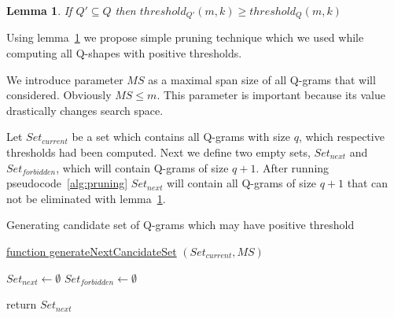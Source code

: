 \documentclass[paper=a4, fontsize=11pt]{scrartcl} %
\newtheorem{lemma}[theorem]{Lemma}
\numberwithin{equation}{section} %
\numberwithin{figure}{section} %
\numberwithin{table}{section} %
\begin{document}
\begin{lemma}
    \label{subSetLemma}
    If $Q' \subseteq Q$ then $threshold_{Q'}(m,k) \geq threshold_{Q}(m,k)$
\end{lemma}

Using lemma~\ref{subSetLemma} we propose simple pruning technique which we used
while computing all Q-shapes with positive thresholds.

We introduce parameter $MS$ as a maximal span size of all Q-grams that will
considered. Obviously $MS \leq m$. This parameter is important because its value
drastically changes search space.

Let $Set_{current}$ be a set which contains all Q-grams with size $q$, which
respective thresholds had been computed.
Next we define two empty sets, $Set_{next}$ and $Set_{forbidden}$, which will
contain Q-grams of size $q+1$. After running pseudocode~\ref{alg:pruning}
$Set_{next}$ will contain all Q-grams of size $q+1$ that can not be eliminated
with lemma~\ref{subSetLemma}. 

\begin{algorithm}[H]
\caption{Generating candidate set of Q-grams which may have positive threshold}
\label{alg:pruning}
\underline{function generateNextCancidateSet} $(Set_{current}, MS)$\;


\begin{algorithmic}
	 \STATE $Set_{next} \gets \emptyset$
	 \STATE $Set_{forbidden} \gets \emptyset$
     
         \ENDFOR
     \ENDFOR
\end{algorithmic}
return $Set_{next}$
\end{algorithm}
\end{document}
